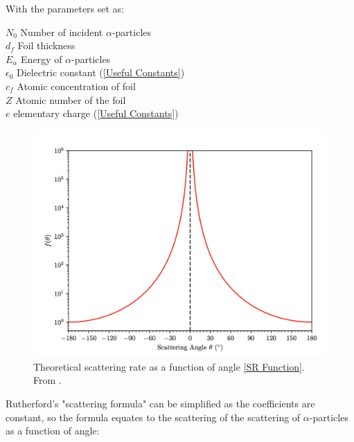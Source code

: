 \documentclass[12pt]{article}
\begin{document}
With the parameters set as:
\begin{multicols}{2}
    $N_0$ \hspace{0.1cm} Number of incident $\alpha$-particles \\
    $d_f$ \hspace{0.1cm} Foil thickness \\
    $E_{\alpha}$ \hspace{0.1cm} Energy of $\alpha$-particles \\
    $\epsilon_0$ \hspace{0.1cm} Dielectric constant (\cref{Useful Constants}) \\
    $c_f$ \hspace{0.1cm} Atomic concentration of foil \\
    $Z$ \hspace{0.1cm} Atomic number of the foil \\
    $e$ \hspace{0.1cm} elementary charge (\cref{Useful Constants}) \\
\end{multicols}
\vspace{0.5cm}

\begin{figure}[H]
\centering
\includegraphics[scale=0.5]{Images/two.png}
\caption{Theoretical scattering rate as a function of angle \cref{SR Function}. From \cite{Exp.6-2019}.}
\label{Theoretical scattering rate as a function of angle}
\end{figure}

Rutherford's "scattering formula" can be simplified as the coefficients are constant, so the formula equates to the scattering of the scattering of $\alpha$-particles as a function of angle: 
\end{document}
